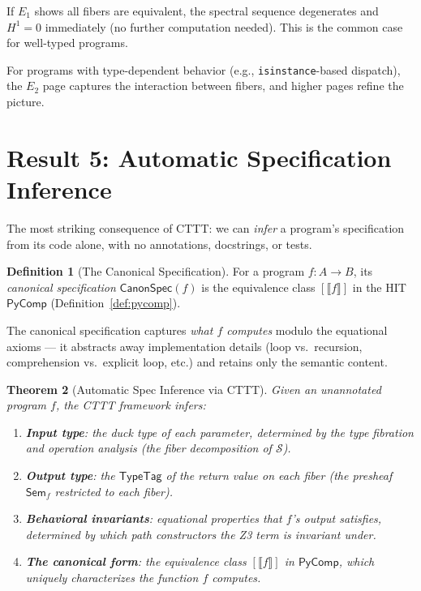 \documentclass[11pt,a4paper]{report}
\theoremstyle{definition}
\newtheorem{definition}{Definition}[chapter]
\theoremstyle{plain}
\newtheorem{theorem}[definition]{Theorem}
\newcommand{\den}[1]{\llbracket #1 \rrbracket}
\newcommand{\Sem}{\mathsf{Sem}}
\newcommand{\Hone}{H^1}
\newcommand{\site}{\mathcal{S}}
\begin{document}
If $E_1$ shows all fibers are equivalent, the spectral sequence
degenerates and $\Hone = 0$ immediately (no further computation
needed).  This is the common case for well-typed programs.

For programs with type-dependent behavior (e.g.,
\texttt{isinstance}-based dispatch), the $E_2$ page captures the
interaction between fibers, and higher pages refine the picture.


\section{Result 5: Automatic Specification Inference}

The most striking consequence of CTTT: we can \emph{infer} a
program's specification from its code alone, with no annotations,
docstrings, or tests.

\begin{definition}[The Canonical Specification]
For a program $f : A \to B$, its \emph{canonical specification}
$\mathsf{CanonSpec}(f)$ is the equivalence class $[\den{f}]$ in the
HIT $\mathsf{PyComp}$ (Definition~\ref{def:pycomp}).
\end{definition}

The canonical specification captures \emph{what $f$ computes} modulo
the equational axioms --- it abstracts away implementation details
(loop vs.\ recursion, comprehension vs.\ explicit loop, etc.) and
retains only the semantic content.

\begin{theorem}[Automatic Spec Inference via CTTT]
\label{thm:spec-inference}
Given an unannotated program $f$, the CTTT framework infers:
\begin{enumerate}
  \item \textbf{Input type}: the duck type of each parameter,
    determined by the type fibration and operation analysis
    (the fiber decomposition of $\site$).
  \item \textbf{Output type}: the $\mathsf{TypeTag}$ of the return
    value on each fiber (the presheaf $\Sem_f$ restricted to each
    fiber).
  \item \textbf{Behavioral invariants}: equational properties that
    $f$'s output satisfies, determined by which path constructors
    the Z3 term is invariant under.
  \item \textbf{The canonical form}: the equivalence class
    $[\den{f}]$ in $\mathsf{PyComp}$, which uniquely characterizes
    the function $f$ computes.
\end{enumerate}
\end{theorem}
\end{document}
